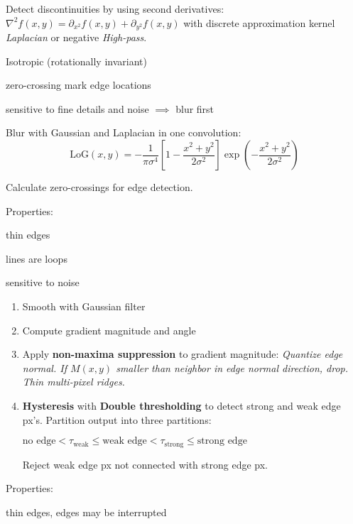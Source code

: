 \begin{definition}
  Detect discontinuities by using second derivatives:
  \(\nabla^2f(x, y) = \partial_{x^2} f(x, y) + \partial_{y^2}f(x, y)\) with discrete approximation kernel \textit{Laplacian} or negative \textit{High-pass}.

  \begin{itemize*}
    \item Isotropic (rotationally invariant)
    \item zero-crossing mark edge locations
    \item sensitive to fine details and noise \(\implies\) blur first
  \end{itemize*}
\end{definition}

\begin{algorithm}[LoG]
  Blur with Gaussian and Laplacian in one convolution:
  \[\text{LoG}(x, y) = -\frac{1}{\pi \sigma^4} \left[1 - \frac{x^2 + y^2}{2\sigma^2}\right]\exp\left(-\frac{x^2 + y^2}{2\sigma^2}\right)\]

  Calculate zero-crossings for edge detection.

  Properties:
  \begin{itemize*}
    \item thin edges
    \item lines are loops
    \item sensitive to noise
  \end{itemize*}
\end{algorithm}

\pagebreak
\begin{algorithm}[Canny]
  \begin{enumerate}
    \item Smooth with Gaussian filter
    \item Compute gradient magnitude and angle
    \item Apply \textbf{non-maxima suppression} to gradient magnitude:
    \textit{Quantize edge normal. If \(M(x, y)\) smaller than neighbor in edge normal direction, drop. Thin multi-pixel ridges.}
    \item \textbf{Hysteresis} with \textbf{Double thresholding} to detect strong and weak edge px's. Partition output into three partitions:
    \begin{center}
      \(\text{no edge} < \tau_{\text{weak}} \leq \text{weak edge} < \tau_{\text{strong}} \leq \text{strong edge}\)
    \end{center}
    Reject weak edge px not connected with strong edge px.
  \end{enumerate}

  Properties:
  \begin{itemize*}
    \item thin edges, edges may be interrupted
  \end{itemize*}
\end{algorithm}

